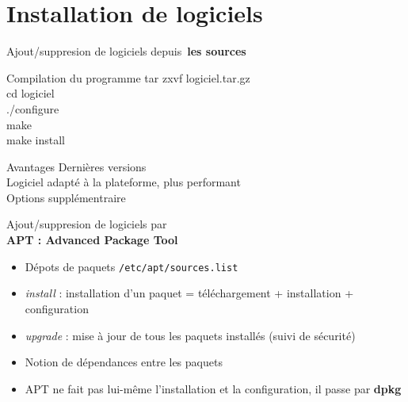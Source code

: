 \documentclass[french]{beamer}
\begin{document}
\section{Installation de logiciels}
\frame{\tableofcontents[current]}


\begin{frame}
Ajout/suppresion de logiciels depuis\
\textbf{les sources}
	\begin{block}{Compilation du programme}
	tar zxvf logiciel.tar.gz\\
	cd logiciel\\
	./configure\\
	make\\
	make install\\
	\end{block}
	\begin{block}{Avantages}
	Dernières versions\\
	Logiciel adapté à la plateforme, plus performant\\
	Options supplémentraire\\
	\end{block}
\end{frame}

\begin{frame}
	\begin{center}
	Ajout/suppresion de logiciels par\\
	\textbf{APT : Advanced Package Tool}
	\end{center}
	\begin{itemize}
	\item Dépots de paquets \texttt{/etc/apt/sources.list}
	\item \textit{install} : installation d'un paquet = téléchargement + installation + configuration 
	\item \textit{upgrade} : mise à jour de tous les paquets installés (suivi de sécurité)
	\item Notion de dépendances entre les paquets
	\item APT ne fait pas lui-même l'installation et la configuration, il passe par \textbf{dpkg}
	\end{itemize}
\end{frame}
\end{document}
